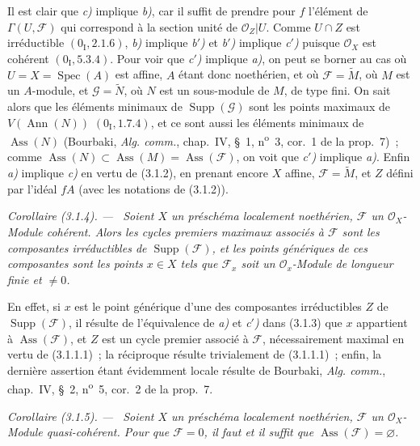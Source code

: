 \documentclass[10pt,oneside]{book}
\makeatletter
\newenvironment{corollary}[1][]{%
  \par\medskip\noindent\itshape Corollaire (#1). ---\ }{\par}
\newcommand{\EGAReaderTarget}[2]{\hypertarget{#1}{}\@bsphack\begingroup\def\@currentHref{#1}\label{#2}\endgroup\@esphack}
\makeatother
\begin{document}
Il est clair que \emph{c)} implique \emph{b)}, car il suffit de prendre pour
$f$ l'élément de $\Gamma(U,\mathcal F)$ qui correspond à la section unité de
$\mathcal O_Z|U$. Comme $U\cap Z$ est irréductible $(0_{\mathrm I},2.1.6)$,
\emph{b)} implique \emph{b$'$)} et \emph{b$'$)} implique \emph{c$'$)} puisque
$\mathcal O_X$ est cohérent $(0_{\mathrm I},5.3.4)$. Pour voir que
\emph{c$'$)} implique \emph{a)}, on peut se borner au cas où
$U=X=\operatorname{Spec}(A)$ est affine, $A$ étant donc noethérien, et où
$\mathcal F=\widetilde M$, où $M$ est un $A$-module, et
$\mathcal G=\widetilde N$, où $N$ est un sous-module de $M$, de type fini.
On sait alors que les éléments minimaux de $\operatorname{Supp}(\mathcal G)$
sont les points maximaux de $V(\operatorname{Ann}(N))$ $(0_{\mathrm I},1.7.4)$,
et ce sont aussi les éléments minimaux de $\operatorname{Ass}(N)$ (Bourbaki,
\emph{Alg. comm.}, chap.~IV, \S~1, n\textsuperscript{o}~3, cor.~1 de la
prop.~7)~; comme $\operatorname{Ass}(N)\subset\operatorname{Ass}(M)
=\operatorname{Ass}(\mathcal F)$, on voit que \emph{c$'$)} implique
\emph{a)}. Enfin \emph{a)} implique \emph{c)} en vertu de (3.1.2), en
prenant encore $X$ affine, $\mathcal F=\widetilde M$, et $Z$ défini par
l'idéal $fA$ (avec les notations de (3.1.2)).

\begin{corollary}[3.1.4]
\label{IV.2.3.1.4-fr}
Soient $X$ un préschéma localement noethérien, $\mathcal F$ un
$\mathcal O_X$-Module cohérent. Alors les cycles premiers maximaux associés à
$\mathcal F$ sont les composantes irréductibles de
$\operatorname{Supp}(\mathcal F)$, et les points génériques de ces composantes
sont les points $x\in X$ tels que $\mathcal F_x$ soit un
$\mathcal O_x$-Module de longueur finie et $\ne0$.
\end{corollary}

En effet, si $x$ est le point générique d'une des composantes irréductibles
$Z$ de $\operatorname{Supp}(\mathcal F)$, il résulte de l'équivalence de
\emph{a)} et \emph{c$'$)} dans (3.1.3) que $x$ appartient à
$\operatorname{Ass}(\mathcal F)$, et $Z$ est un cycle premier associé à
$\mathcal F$, nécessairement maximal en vertu de (3.1.1.1)~; la réciproque
résulte trivialement de (3.1.1.1)~; enfin, la dernière assertion étant
évidemment locale résulte de Bourbaki, \emph{Alg. comm.}, chap.~IV, \S~2,
n\textsuperscript{o}~5, cor.~2 de la prop.~7.

\begin{corollary}[3.1.5]
\EGAReaderTarget{ega4.c04.cor.3-1-5}{IV.2.3.1.5-fr}
Soient $X$ un préschéma localement noethérien, $\mathcal F$ un
$\mathcal O_X$-Module quasi-cohérent. Pour que $\mathcal F=0$, il faut et il
suffit que $\operatorname{Ass}(\mathcal F)=\varnothing$.
\end{corollary}
\end{document}
